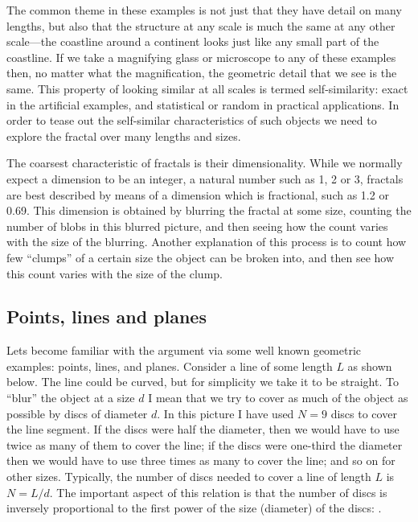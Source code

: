 \documentclass[12pt,a5paper]{article}
\begin{document}
The common theme in these examples is not just that they have detail 
on many lengths, but also that the structure at any scale is much the 
same at any other scale---the coastline around a continent looks just 
like any small part of the coastline.  If we take a magnifying glass 
or microscope to any of these examples then, no matter what the 
magnification, the geometric detail that we see is the same.  This 
property of looking similar at all scales is termed self-similarity: 
exact in the artificial examples, and statistical or random in 
practical applications.  In order to tease out the self-similar 
characteristics of such objects we need to explore the fractal over 
many lengths and sizes.  

The coarsest characteristic of fractals is their dimensionality.  
While we normally expect a dimension to be an integer, a natural 
number such as 1, 2 or 3, fractals are best described by means of a 
dimension which is fractional, such as 1.2 or 0.69.  This dimension 
is obtained by blurring the fractal at some size, counting the number 
of blobs in this blurred picture, and then seeing how the count 
varies with the size of the blurring.  Another explanation of this 
process is to count how few ``clumps'' of a certain size the object can 
be broken into, and then see how this count varies with the size of 
the clump.  

\subsection{Points, lines and planes}

Lets become familiar with the argument via some well known geometric 
examples: points, lines, and planes.  Consider a line of some length 
$L$ as shown below.  The line
could be curved, but for simplicity we take it to be straight.  To 
``blur'' the object at a size 
\(
	d
\)
 I mean that we try to cover as much of 
the object as possible by discs of diameter $d$.  In this picture I 
have used 
\(
	N=9
\)
 discs to cover the line segment.  If the discs were 
half the diameter, then we would have to use twice as many of them to 
cover the line;  if the discs were one-third the diameter then we 
would have to use three times as many to cover the line;  and so on 
for other sizes.  Typically, the number of discs needed to cover a 
line of length $L$ is $N=L/d$.  The important aspect of this relation is 
that the number of discs is inversely proportional to the first power 
of the size (diameter) of the discs: .  
\end{document}
